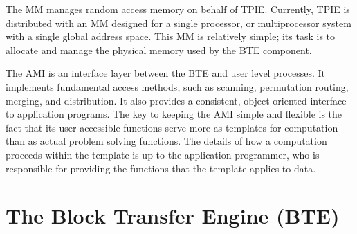 
The MM manages random access memory on behalf of
TPIE.
Currently, TPIE is distributed with an MM designed for a single
processor, or multiprocessor system with a single global address
space. This MM is relatively simple; its task is to allocate and
manage the physical memory used by the BTE component.


The AMI is an interface layer between
the BTE and user level processes.  It implements fundamental access
methods, such as scanning, permutation routing, merging, and
distribution. It also provides a consistent, object-oriented interface
to application programs.
The key to keeping the AMI simple and flexible is the fact that its
user accessible functions serve more as templates for computation than
as actual problem solving functions.  The details of how a computation
proceeds within the template is up to the application programmer, who
is responsible for providing the functions that the template applies
to data.

\section{The Block Transfer Engine (BTE)}


